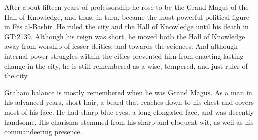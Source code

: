 After about fifteen years of professorship he rose to be the Grand Magus of
the Hall of Knowledge, and thus, in turn, became the most powerful political
figure in Fes al-Bashir. He ruled the city and the Hall of Knowledge until his
death in GT:2139. Although his reign was short, he moved both the Hall of
Knowledge away from worship of lesser deities, and towards the sciences. And
although internal power struggles within the cities prevented him from
enacting lasting change in the city, he is still remembered as a wise,
tempered, and just ruler of the city.

Graham balance is mostly remembered when he was Grand Magus. As a man in his
advanced years, short hair, a beard that reaches down to his chest and covers
most of his face. He had sharp blue eyes, a long elongated face, and was
decently handsome. His charisma stemmed from his sharp and eloquent wit, as
well as his commandeering presence.
